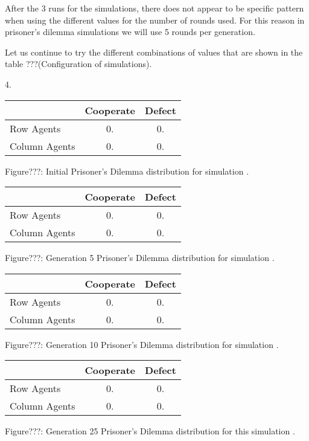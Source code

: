 \documentclass{article}
\begin{document}
After the 3 runs for the simulations, there does not appear to be specific pattern when using the different values for the number of rounds used. For this reason in prisoner's dilemma simulations we will use 5 rounds per generation.

Let us continue to try the different combinations of values that are shown in the table ???(Configuration of simulations). 

4.

\begin{center}
\begin{tabular}{|l|c|c|}
\hline
& Cooperate & Defect \\ 
\hline
Row Agents & 0. & 0.\\
\hline
Column Agents & 0. & 0.\\
\hline
\end{tabular}
\end{center}
\begin{center}
Figure???: Initial Prisoner’s Dilemma distribution for simulation .
\end{center}


\begin{center}
\begin{tabular}{|l|c|c|}
\hline
& Cooperate & Defect \\ 
\hline
Row Agents & 0. & 0.\\
\hline
Column Agents & 0. & 0.\\
\hline
\end{tabular}
\end{center}
\begin{center}
Figure???: Generation 5 Prisoner’s Dilemma distribution for simulation .
\end{center}


\begin{center}
\begin{tabular}{|l|c|c|}
\hline
& Cooperate & Defect \\ 
\hline
Row Agents & 0. & 0.\\
\hline
Column Agents & 0. & 0.\\
\hline
\end{tabular}
\end{center}
\begin{center}
Figure???: Generation 10 Prisoner’s Dilemma distribution for simulation .
\end{center}

\begin{center}
\begin{tabular}{|l|c|c|}
\hline
& Cooperate & Defect \\ 
\hline
Row Agents & 0. & 0.\\
\hline
Column Agents & 0. & 0.\\
\hline
\end{tabular}
\end{center}
\begin{center}
Figure???: Generation 25 Prisoner’s Dilemma distribution for this simulation .
\end{center}
\end{document}
